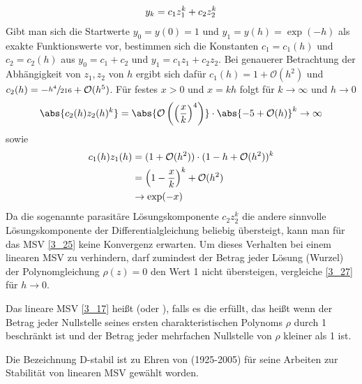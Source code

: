 \begin{example}
	\begin{align}
		y_k = c_1z_1 ^k + c_2z_2^k \notag
	\end{align}
	Gibt man sich die Startwerte $y_0=y(0)=1$ und $y_1=y(h)=\exp(-h)$ als exakte Funktionswerte vor, bestimmen sich die Konstanten $c_1=c_1(h)$ und $c_2=c_2(h)$ aus $y_0=c_1+c_2$ und $y_1=c_1z_1 + c_2z_2$. Bei genauerer Betrachtung der Abhängigkeit von $z_1,z_2$ von $h$ ergibt sich dafür $c_1(h)=1+\mathcal{O}(h^2)$ und $c_2(h)=-\sfrac{h^4}{216} + \mathcal{O}(h^5)$. Für festes $x>0$ und $x=kh$ folgt für $k\to\infty$ und $h\to 0$
	\begin{align}
		\abs{c_2(h) z_2(h)^k} = \abs{\mathcal{O}\left(\left(\frac{x}{k}\right)^4\right)}\cdot\abs{-5+\mathcal{O}(h)}^k\to\infty \notag
	\end{align}
	sowie
	\begin{align}
		c_1(h) z_1(h) &= (1+\mathcal{O}(h^2))\cdot (1-h+\mathcal{O}(h^2))^k \notag \\
		&= \left(1-\frac{x}{k}\right)^k + \mathcal{O}(h^2) \notag \\
		&\to\exp(-x)\notag
	\end{align}
	Da die sogenannte parasitäre Lösungskomponente $c_2z_2^k$ die andere sinnvolle Lösungskomponente der Differentialgleichung beliebig übersteigt, kann man für das MSV \cref{3_25} keine Konvergenz erwarten. Um dieses Verhalten bei einem linearen MSV zu verhindern, darf zumindest der Betrag jeder Lösung (Wurzel) der Polynomgleichung $\rho(z)=0$ den Wert 1 nicht übersteigen, vergleiche \cref{3_27} für $h\to 0$.
\end{example}

\begin{definition}
	Das lineare MSV \cref{3_17} heißt  (oder ), falls es die  erfüllt, das heißt wenn der Betrag jeder Nullstelle seines ersten charakteristischen Polynoms $\rho$ durch 1 beschränkt ist und der Betrag jeder mehrfachen Nullstelle von $\rho$ kleiner als 1 ist.
\end{definition}

Die Bezeichnung D-stabil ist zu Ehren von  (1925-2005) für seine Arbeiten zur Stabilität von linearen MSV gewählt worden.

